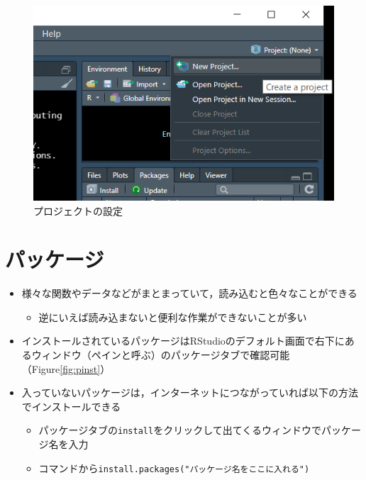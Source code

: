 \documentclass[
  xelatex,ja=standard, b5paper]{bxjsbook}
\providecommand{\tightlist}{%
  \setlength{\itemsep}{0pt}\setlength{\parskip}{0pt}}
\begin{document}
\begin{figure}

{\centering \includegraphics[width=7.11in]{images/project} 

}

\caption{プロジェクトの設定}\label{fig:project}
\end{figure}

\hypertarget{p-package}{%
\section{パッケージ}\label{p-package}}

\begin{itemize}
\tightlist
\item
  様々な関数やデータなどがまとまっていて，読み込むと色々なことができる

  \begin{itemize}
  \tightlist
  \item
    逆にいえば読み込まないと便利な作業ができないことが多い
  \end{itemize}
\item
  インストールされているパッケージはRStudioのデフォルト画面で右下にあるウィンドウ（ペインと呼ぶ）のパッケージタブで確認可能（Figure\ref{fig:pinst}）\\
\item
  入っていないパッケージは，インターネットにつながっていれば以下の方法でインストールできる

  \begin{itemize}
  \tightlist
  \item
    パッケージタブの\texttt{install}をクリックして出てくるウィンドウでパッケージ名を入力
  \item
    コマンドから\texttt{install.packages("パッケージ名をここに入れる")}
  \end{itemize}
\end{itemize}
\end{document}
